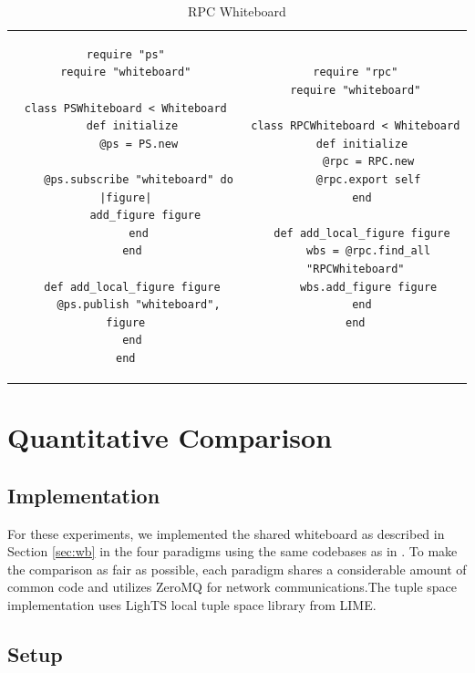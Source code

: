 \documentclass{llncs}
\begin{document}
\begin{table}
\centering
\begin{tabular}{c c}
\begin{minipage}{2.75in}
\begin{verbatim}
require "ps"
require "whiteboard"

class PSWhiteboard < Whiteboard
  def initialize
    @ps = PS.new
    
    @ps.subscribe "whiteboard" do |figure|
      add_figure figure
    end
  end

  def add_local_figure figure
    @ps.publish "whiteboard", figure
  end
end
\end{verbatim}
\caption{Publish/Subscribe Whiteboard}
\end{minipage}\label{fig:pswb}
&
\begin{minipage}{2.5in}
\begin{verbatim}
require "rpc"
require "whiteboard"

class RPCWhiteboard < Whiteboard
  def initialize
    @rpc = RPC.new
    @rpc.export self
  end

  def add_local_figure figure
    wbs = @rpc.find_all "RPCWhiteboard"
    wbs.add_figure figure
  end
end


\end{verbatim}
\caption{RPC Whiteboard}
\end{minipage}\label{fig:rpcwb}
\end{tabular}
\end{table}

\section{Quantitative Comparison}\label{sec:comparison}

\subsection{Implementation}

For these experiments, we implemented the shared whiteboard as described in Section \ref{sec:wb} in the four paradigms using the same codebases as in \cite{melon}. To make the comparison as fair as possible, each paradigm shares a considerable amount of common code and utilizes ZeroMQ for network communications.The tuple space implementation uses LighTS\cite{lights} local tuple space library from LIME.

\subsection{Setup}
\end{document}

